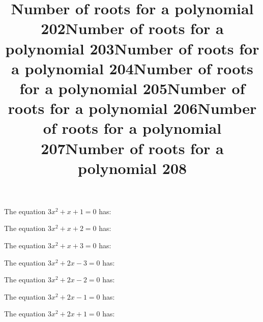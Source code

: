 \documentclass{article}
\begin{document}
\begin{category}
\begin{question}[multichoice]
\end{question}
\begin{question}[multichoice]
\title{Number of roots for a polynomial 202}
The equation $3 x^{2} + x + 1=0$ has:


\end{question}
\begin{question}[multichoice]
\title{Number of roots for a polynomial 203}
The equation $3 x^{2} + x + 2=0$ has:


\end{question}
\begin{question}[multichoice]
\title{Number of roots for a polynomial 204}
The equation $3 x^{2} + x + 3=0$ has:


\end{question}
\begin{question}[multichoice]
\title{Number of roots for a polynomial 205}
The equation $3 x^{2} + 2 x - 3=0$ has:


\end{question}
\begin{question}[multichoice]
\title{Number of roots for a polynomial 206}
The equation $3 x^{2} + 2 x - 2=0$ has:


\end{question}
\begin{question}[multichoice]
\title{Number of roots for a polynomial 207}
The equation $3 x^{2} + 2 x - 1=0$ has:


\end{question}
\begin{question}[multichoice]
\title{Number of roots for a polynomial 208}
The equation $3 x^{2} + 2 x + 1=0$ has:


\end{question}
\end{category}
\end{document}
